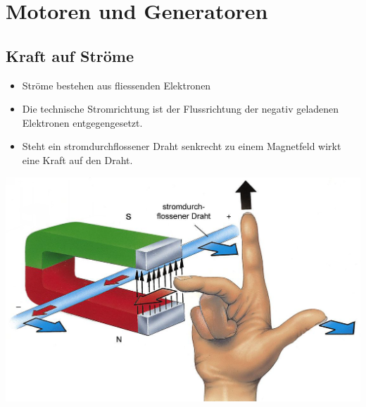 \section*{Motoren und Generatoren}


\subsection*{Kraft auf Ströme}
\begin{itemize}
\item Ströme \textquotedbl{}bestehen\textquotedbl{} aus fliessenden Elektronen
\item Die \textquotedbl{}technische Stromrichtung\textquotedbl{} ist der
Flussrichtung der negativ geladenen Elektronen entgegengesetzt.
\item Steht ein stromdurchflossener Draht senkrecht zu einem Magnetfeld
wirkt eine Kraft auf den Draht.
\end{itemize}
\includegraphics[scale=0.4]{Magnetismus/Lorentzkraft}
